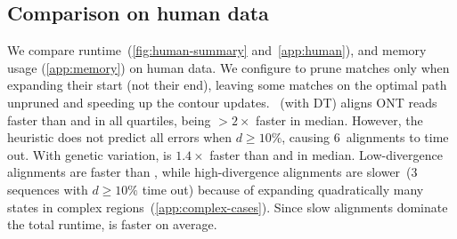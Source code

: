 \subsection{Comparison on human data} \label{sec:evals-comparison-hg}

We compare runtime~(\cref{fig:human-summary} and~\cref{app:human}), and memory
usage (\cref{app:memory}) on human data.
%
We configure \astarpa to prune matches only when expanding their start (not
their end), leaving some matches on the optimal path unpruned and speeding up
the contour updates.
%
\astarpa~(\GCH with DT) aligns ONT reads faster than \edlib and \wfa in all
quartiles, being ${>}2\times$ faster in median. However, the heuristic does not predict all errors
when $d{\geq}10\%$, causing $6$~alignments to time out.
%
With genetic variation, \astarpa is $1.4\times$ faster than \edlib and \wfa in
median. Low-divergence alignments are faster than \edlib, while
high-divergence alignments are slower~($3$ sequences with $d{\geq}10\%$ time out) because of expanding
quadratically many states in complex regions~(\cref{app:complex-cases}). Since slow alignments
dominate the total runtime, \edlib is faster on average.
